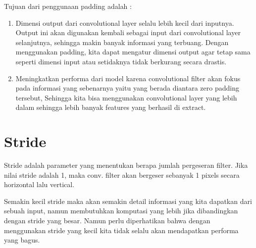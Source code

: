Tujuan dari penggunaan padding adalah :
\begin{enumerate}
\item Dimensi output dari convolutional layer selalu lebih kecil dari inputnya. Output ini akan digunakan kembali sebagai input dari convolutional layer selanjutnya, sehingga makin banyak informasi yang terbuang. Dengan menggunakan padding, kita dapat mengatur dimensi output agar tetap sama seperti dimensi input atau setidaknya tidak berkurang secara drastis.

\item Meningkatkan performa dari model karena convolutional filter akan fokus pada informasi yang sebenarnya yaitu yang berada diantara zero padding tersebut, Sehingga kita bisa menggunakan convolutional layer yang lebih dalam sehingga lebih banyak features yang berhasil di extract.
\end{enumerate}

\section{Stride}
Stride adalah parameter yang menentukan berapa jumlah pergeseran filter. Jika nilai stride adalah 1, maka conv. filter akan bergeser sebanyak 1 pixels secara horizontal lalu vertical.

Semakin kecil stride maka akan semakin detail informasi yang kita dapatkan dari sebuah input, namun membutuhkan komputasi yang lebih jika dibandingkan dengan stride yang besar. Namun perlu diperhatikan bahwa dengan menggunakan stride yang kecil kita tidak selalu akan mendapatkan performa yang bagus.